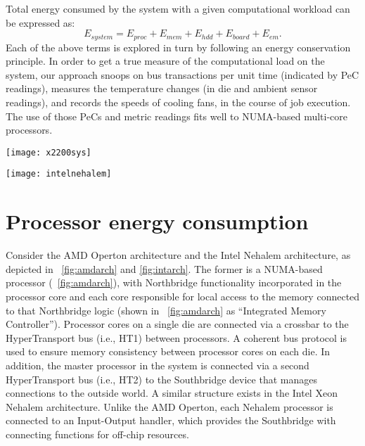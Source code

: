 Total energy consumed by the system with a given computational workload
can be expressed as:
\begin{equation}
\label{eq:linmodel}
E_{system}= E_{proc} + E_{mem} + E_{hdd}+ E_{board} +  E_{em}.
\end{equation}
Each of the above terms is explored in turn by following an energy
conservation principle.  In order to get a true measure of the
computational load on the system, our approach snoops on bus
transactions per unit time (indicated by PeC readings), measures the
temperature changes (in die and ambient sensor readings), and records
the speeds of cooling fans, in the course of job execution.  The use of
those PeCs and metric readings fits well to NUMA-based multi-core
processors. 
\begin{figure*}[tp]
  \begin{minipage}{0.5\linewidth}
  \centering
     \texttt{[image: x2200sys]}
     \caption{AMD Opteron architecture.}
     \label{fig:amdarch}
  \end{minipage}\hspace{0.1cm}
  \begin{minipage}{0.5\linewidth}
  \centering
     \texttt{[image: intelnehalem]}
     \caption{Intel Xeon (Nehalem) architecture.}
     \label{fig:intarch}
  \end{minipage}
\end{figure*}
\section{Processor energy consumption}
\label{sec:procmodel}
Consider the AMD Operton architecture and the Intel Nehalem
architecture, as depicted in \figurenames~\ref{fig:amdarch} and
\ref{fig:intarch}.  The former is a NUMA-based processor
(\figurename~\ref{fig:amdarch}), with Northbridge functionality
incorporated in the processor core and each core responsible for local
access to the memory connected to that Northbridge logic (shown in
\figurename~\ref{fig:amdarch} as ``Integrated Memory Controller'').
Processor cores on a single die are connected via a crossbar to the
HyperTransport bus (i.e., HT1) between processors.  A coherent bus
protocol is used to ensure memory consistency between processor cores on
each die.  In addition, the master processor in the system is connected
via a second HyperTransport bus (i.e., HT2) to the Southbridge device
that manages connections to the outside world.  A similar structure
exists in the Intel Xeon Nehalem architecture.  Unlike the AMD Operton,
each Nehalem processor is connected to an Input-Output handler, which
provides the Southbridge with connecting functions for off-chip resources.


